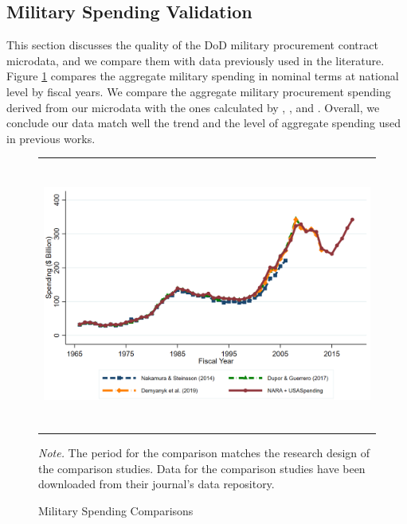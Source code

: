 \documentclass[dv_diss_main.tex]{subfiles}
\begin{document}
\subsection{Military Spending Validation}
\label{sec:app_data}

This section discusses the quality of the DoD military procurement contract microdata, and we compare them with data previously used in the literature. Figure \ref{fig:spend_comparison} compares the aggregate military spending in nominal terms at national level by fiscal years. We compare the aggregate military procurement spending derived from our microdata with the ones calculated by \cite{Nakamura2014}, \cite{Dupor2017}, and \cite{Demyanyk2019}. Overall, we conclude our data match well the trend and the level of aggregate spending used in previous works. 

\begin{figure}[ht]
    \begin{center}
       \begin{tabular}[c]{c}
    
    {\includegraphics[height=3.5in,width=5.5in]{figures/graph_milspend_comparison.png}} \\[0.1in]

    
    \end{tabular}
     
    \end{center}
    \caption{Military Spending Comparisons}
   
    \footnotesize{\textit{Note.} The period for the comparison matches the research design of the comparison studies. Data for the comparison studies have been downloaded from their journal's data repository.}
    \label{fig:spend_comparison}
\end{figure}
\end{document}
